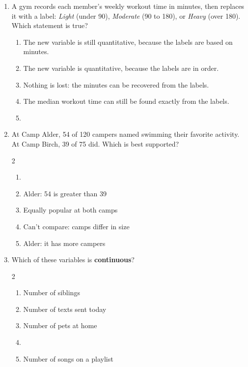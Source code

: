 \documentclass[12pt]{article}
\newenvironment{choices}
  {\begin{enumerate}[label=\textbf{(\Alph*)}, leftmargin=2.2em, itemsep=0pt, topsep=1pt]}
  {\end{enumerate}}
\newcommand{\letterroom}{\rule[-15pt]{0pt}{36pt}}
\begin{document}
\begin{enumerate}[leftmargin=1.9em, itemsep=0.03in]

  \boxguard[10]
  \item A gym records each member's weekly workout time in minutes, then replaces it with a
        label: \emph{Light} (under 90), \emph{Moderate} (90 to 180), or \emph{Heavy} (over 180).
        Which statement is true?
        \begin{choices}
          \item The new variable is still quantitative, because the labels are based on minutes.
          \item The new variable is quantitative, because the labels are in order.
          \item Nothing is lost: the minutes can be recovered from the labels.
          \item The median workout time can still be found exactly from the labels.
          \item {}
                \hfill{}\letterroom
        \end{choices}

  \boxguard[10]
  \item At Camp Alder, 54 of 120 campers named swimming their favorite activity. At Camp Birch,
        39 of 75 did. Which is best supported?\hfill{}\letterroom
        \begin{multicols}{2}
        \begin{choices}
          \item {}
          \item Alder: 54 is greater than 39
          \item Equally popular at both camps
          \item Can't compare: camps differ in size
          \item Alder: it has more campers
        \end{choices}
        \end{multicols}

  \boxguard[8]
  \item Which of these variables is \textbf{continuous}?\hfill{}\letterroom
        \begin{multicols}{2}
        \begin{choices}
          \item Number of siblings
          \item Number of texts sent today
          \item Number of pets at home
          \item {}
          \item Number of songs on a playlist
        \end{choices}
        \end{multicols}


\end{enumerate}
\end{document}
